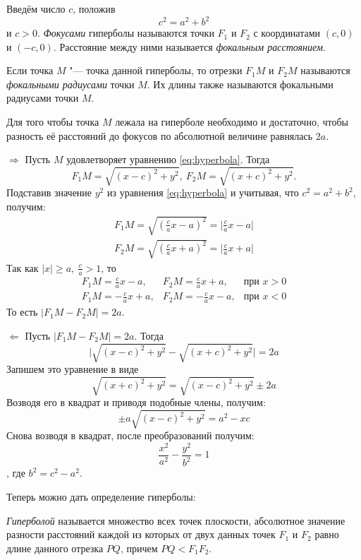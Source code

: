 Введём число $c$, положив
$$
  c^2 = a^2 + b^2
$$ и $c > 0$. \textit{Фокусами} гиперболы называются точки $F_1$ и $F_2$ с координатами $(c, 0)$ и $(-c, 0)$. Расстояние между ними называется \textit{фокальным расстоянием}.

Если точка $M$ "--- точка данной гиперболы, то отрезки $F_1M$ и $F_2M$ называются \textit{фокальными радиусами} точки $M$. Их длины также называются фокальными радиусами точки $M$.

\begin{theorem}
  Для того чтобы точка $M$ лежала на гиперболе необходимо и достаточно, чтобы разность её расстояний до фокусов по абсолютной величине равнялась $2a$.
\end{theorem}
\begin{Proof}
  $\Rightarrow$ Пусть $M$ удовлетворяет уравнению \ref{eq:hyperbola}. Тогда
    $$
    F_1M = \sqrt{(x - c)^2 + y^2}, ~ F_2M = \sqrt{(x + c)^2 + y^2}.
    $$
    Подставив значение $y^2$ из уравнения \ref{eq:hyperbola} и учитывая, что $c^2 = a^2 + b^2$, получим:
    \begin{gather*}
      F_1M = \sqrt{(\frac{c}{a}x - a)^2} = \mathopen|\frac{c}{a}x - a \mathclose| \\
      F_2M = \sqrt{(\frac{c}{a}x + a)^2} = \mathopen|\frac{c}{a}x + a \mathclose|
    \end{gather*}
    Так как $\mathopen|x\mathclose| \geq a, ~ \frac{c}{a} > 1$, то 
    $$
    \begin{array}{ccc}
      F_1M = \frac{c}{a}x - a, & F_2M = \frac{c}{a}x + a, & \text{при }x > 0 \\
      F_1M = -\frac{c}{a}x + a, & F_2M = -\frac{c}{a}x - a, & \text{при }x < 0 
    \end{array}
    $$
    То есть $\mathopen|F_1M - F_2M\mathclose| = 2a$.

  $\Leftarrow$ Пусть $\mathopen|F_1M - F_2M\mathclose| = 2a$. Тогда
  $$
    \mathopen| \sqrt{(x - c)^2 + y^2} - \sqrt{(x + c)^2 + y^2} \mathclose| = 2a
  $$
  Запишем это уравнение в виде 
  $$
  \sqrt{(x + c)^2 + y^2}  = \sqrt{(x - c)^2 + y^2} \pm 2a
  $$
  Возводя его в квадрат и приводя подобные члены, получим:
  $$
    \pm a \sqrt{(x - c)^2 + y^2} = a^2 - xc
  $$
  Снова возводя в квадрат, после преобразований получим:
  $$
    \frac{x^2}{a^2} - \frac{y^2}{b^2} = 1
  $$, где $b^2 = c^2 - a^2$.
\end{Proof}
Теперь можно дать определение гиперболы:
\begin{definition}
  \textit{Гиперболой} называется множество всех точек плоскости, абсолютное значение разности расстояний каждой из которых от двух данных точек $F_1$ и $F_2$ равно длине данного отрезка $PQ$, причем $PQ < F_1F_2$.
\end{definition}


